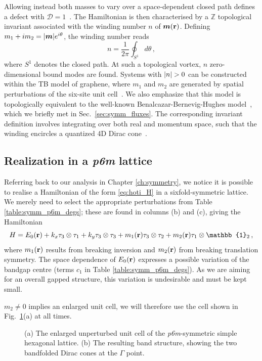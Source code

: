 Allowing instead both masses to vary over a space-dependent closed path defines a defect with $\mathcal{D} = 1$~\cite{Teo_2010}. The Hamiltonian is then characterised by a $\mathbb{Z}$ topological invariant associated with the winding number $n$ of $\boldsymbol{m}(\vb{r})$. Defining $m_1 + i m_2 = \abs{\boldsymbol{m}} e^{i \theta}$, the winding number reads
\begin{equation} \label{eq:invariant}
n = \frac{1}{2\pi} \oint_{S^1} d\theta\,,
\end{equation}
where $S^1$ denotes the closed path. At such a topological vortex, $n$ zero-dimensional bound modes are found. Systems with $\abs{n} > 0$ can be constructed within the TB model of graphene, where $m_1$ and $m_2$ are generated by spatial perturbations of the six-site unit cell~\cite{Hou_2007}. We also emphasize that this model is topologically equivalent to the well-known Benalcazar-Bernevig-Hughes model~\cite{Fukui_2019}, which we briefly met in Sec.~\ref{sec:symm_fluxes}. The corresponding invariant definition involves integrating over both real and momentum space, such that the winding encircles a quantized 4D Dirac cone~\cite{Petrides_2020}.

\subsection{Realization in a \textit{p6m} lattice}

Referring back to our analysis in Chapter \ref{ch:symmetry}, we notice it is possible to realise a Hamiltonian of the form \eqref{eq:hoti_H} in a sixfold-symmetric lattice. We merely need to select the appropriate perturbations from Table \ref{table:symm_p6m_degs}; these are found in columns (b) and (c), giving the Hamiltonian
\begin{equation} \label{eq:hoti_H_4band}
H = E_0(\vb{r}) + k_x  \tau_3 \otimes \tau_1 + k_y  \tau_3 \otimes \tau_3 + m_1(\vb{r})  \tau_3 \otimes \tau_2 + m_2(\vb{r})  \tau_1  \otimes \mathbb{1}_2 \,,
\end{equation}
where $m_1(\vb{r})$ results from breaking inversion and $m_2(\vb{r})$ from breaking translation symmetry. The space dependence of $E_0(\vb{r})$ expresses a possible variation of the bandgap centre (terms $c_1$ in Table \ref{table:symm_p6m_degs}). As we are aiming for an overall gapped structure, this variation is undesirable and must be kept small.

$m_2 \neq 0$ implies an enlarged unit cell, we will therefore use the cell shown in Fig.~\ref{fig:hoti_folding}(a) at all times.
%
 \begin{figure} [h!]
 	\centering
 	
 	\caption{(a) The enlarged unperturbed unit cell of the \textit{p6m}-symmetric simple hexagonal lattice. (b) The resulting band structure, showing the two bandfolded Dirac cones at the $\Gamma$ point.  }
 	\label{fig:hoti_folding}			
 \end{figure}
 
